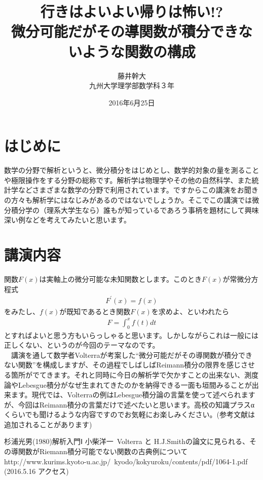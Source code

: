\documentclass[12pt]{jsarticle}
\title{行きはよいよい帰りは怖い!?\\
{\large
微分可能だがその導関数が積分できないような関数の構成}}%
\author{藤井幹大\\%
{\small
九州大学理学部数学科３年　%
}}
\date{2016年6月25日}%
\begin{document}
\maketitle
\thispagestyle{fancy}
\section{はじめに}
数学の分野で解析というと、微分積分をはじめとし、数学的対象の量を測ることや極限操作をする分野の総称です。解析学は物理学やその他の自然科学、また統計学などさまざまな数学の分野で利用されています。ですからこの講演をお聞きの方々も解析学にはなじみがあるのではないでしょうか。そこでこの講演では微分積分学の（理系大学生なら）誰もが知っているであろう事柄を題材にして興味深い例などを考えてみたいと思います。%
\section{講演内容}
関数$F(x)$は実軸上の微分可能な未知関数とします。このとき$F(x)$が常微分方程式　
\begin{eqnarray*}
F^{\prime}(x)=f(x)
\end{eqnarray*}
をみたし、$f(x)$が既知であるとき関数$F(x)$を求めよ、といわれたら
\begin{eqnarray*}
F=\int_{0}^{x} f(t)dt
\end{eqnarray*}
とすればよいと思う方もいらっしゃると思います。しかしながらこれは一般には正しくない、というのが今回のテーマなのです。\\
\ \ 講演を通して数学者Volterraが考案した“微分可能だがその導関数が積分できない関数”を構成しますが、その過程でしばしばReimann積分の限界を感じさせる箇所がでてきます。それと同時に今日の解析学で欠かすことの出来ない、測度論やLebesgue積分がなぜ生まれてきたのかを納得できる一面も垣間みることが出来ます。現代では、Volterraの例はLebesgue積分論の言葉を使って述べられますが、今回はReimann積分の言葉だけで述べたいと思います。高校の知識プラスαくらいでも聞けるような内容ですのでお気軽にお楽しみください。(参考文献は追加されることがあります)%
\begin{thebibliography}{9}%
杉浦光男(1980)解析入門Ⅰ
小柴洋一\ Volterra と H.$\mathrm{J}$.Smithの論文に見られる、その導関数がRiemann積分可能でない関数の古典例について\\ http://www.kurims.kyoto-u.ac.jp/~kyodo/kokyuroku/contents/pdf/1064-1.pdf\\ (2016.5.16 アクセス)
\end{thebibliography}
\end{document}
